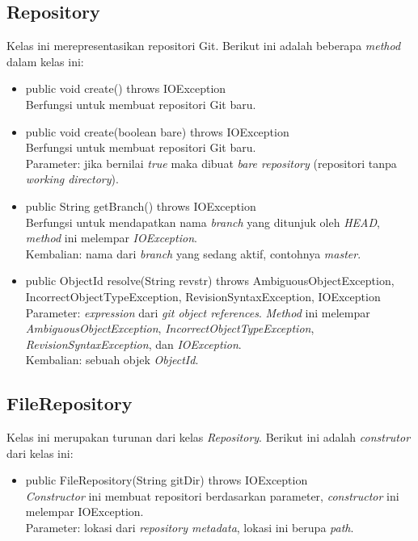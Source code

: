 \subsection{Repository}
\label{subsec:repository}
Kelas ini merepresentasikan repositori Git. Berikut ini adalah beberapa \textit{method} dalam kelas ini:
\begin{itemize}
\item public void create() throws IOException\\
Berfungsi untuk membuat repositori Git baru.
\item public void create(boolean bare) throws IOException\\
Berfungsi untuk membuat repositori Git baru. \\
Parameter: jika bernilai \textit{true} maka dibuat \textit{bare repository} (repositori tanpa \textit{working directory}). 
\item public String getBranch() throws IOException\\
Berfungsi untuk mendapatkan nama \textit{branch} yang ditunjuk oleh \textit{HEAD}, \textit{method} ini melempar \textit{IOException}.\\ 
Kembalian: nama dari \textit{branch} yang sedang aktif, contohnya \textit{master}.

\item public ObjectId resolve(String revstr) throws AmbiguousObjectException, IncorrectObjectTypeException, RevisionSyntaxException, IOException\\
Parameter: \textit{expression} dari \textit{git object references}. \textit{Method} ini melempar \textit{AmbiguousObjectException}, \textit{IncorrectObjectTypeException}, \textit{RevisionSyntaxException}, dan \textit{IOException}.\\
Kembalian: sebuah objek \textit{ObjectId}.
\end{itemize} 

\subsection{FileRepository}
\label{subsec:filerepository}
Kelas ini merupakan turunan dari kelas \textit{Repository}. Berikut ini adalah \textit{construtor} dari kelas ini:
\begin{itemize}
\item public FileRepository(String gitDir) throws IOException\\
\textit{Constructor} ini membuat repositori berdasarkan parameter, \textit{constructor} ini melempar IOException.\\
Parameter: lokasi dari \textit{repository metadata}, lokasi ini berupa \textit{path}.
\end{itemize}


